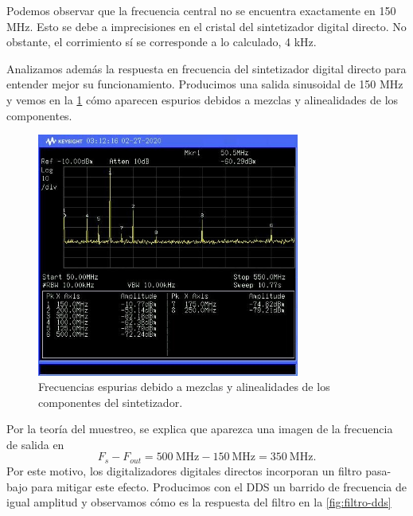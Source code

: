 \documentclass{article}
\newenvironment{standalone}{\begin{preview}}{\end{preview}}
\begin{document}
\begin{standalone}
  Podemos observar que la frecuencia central no se encuentra exactamente en 150 MHz.
  Esto se debe a imprecisiones en el cristal del sintetizador digital directo.
  No obstante, el corrimiento sí se corresponde a lo calculado, 4 kHz.

  Analizamos además la respuesta en frecuencia del sintetizador digital directo para entender mejor su funcionamiento.
  Producimos una salida sinusoidal de 150 MHz y vemos en la \cref{fig:espurios} cómo aparecen espurios debidos a mezclas y alinealidades de los componentes.

  \begin{figure}[!htbp]
    \centering
    \includegraphics[width=\linewidth, height=80mm, keepaspectratio]{../images/espurios.jpg}
    \caption{Frecuencias espurias debido a mezclas y alinealidades de los componentes del sintetizador.}
    \label{fig:espurios}
  \end{figure}

  Por la teoría del muestreo, se explica que aparezca una imagen de la frecuencia de salida en
  \begin{equation}
    F_s - F_{out} = 500 \ \si{\mega\hertz} - 150 \ \si{\mega\hertz} = 350 \ \si{\mega\hertz}. \nonumber
  \end{equation}
  Por este motivo, los digitalizadores digitales directos incorporan un filtro pasa-bajo para mitigar este efecto.
  Producimos con el DDS un barrido de frecuencia de igual amplitud y observamos cómo es la respuesta del filtro en la \cref{fig:filtro-dds}


\end{standalone}
\end{document}
